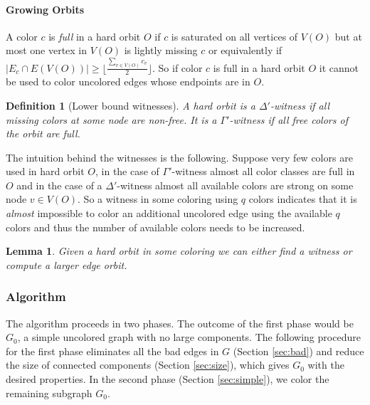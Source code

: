 \documentclass[titlepage, 11pt]{article}
\newtheorem{definition}{Definition}
\newtheorem{lemma}[theorem]{Lemma}
\begin{document}
\paragraph{Growing Orbits}
A color $c$ is \emph{full} in a hard orbit $O$ if $c$ is saturated on all vertices of $V(O)$ but at most one vertex in $V(O)$ is lightly missing $c$ or equivalently if $|E_c \cap E(V(O))| \geq  {\lfloor \frac{\sum_{v \in V(O)} c_v}{2} \rfloor}. $
So if color $c$ is full in a hard orbit $O$ it cannot be used to color uncolored edges whose endpoints are in $O$.
\begin{definition}[Lower bound witnesses]
A hard orbit is a $\Delta'$-witness if all missing colors at some node are non-free. It is a $\Gamma'$-witness if all free colors of the orbit are full.
\end{definition}
The intuition behind the witnesses is the following. Suppose very few colors are used in hard orbit $O$, in the case of $\Gamma'$-witness almost all color classes are full in $O$ and in the case of a $\Delta'$-witness almost all available colors are strong on some node $v \in V(O)$. So a witness in some coloring using $q$ colors indicates that it is \textit{almost} impossible to color an additional uncolored edge using the available $q$ colors and thus the number of available colors needs to be increased.  
\begin{lemma}\label{lemma:groworbit}
\cite{sanders05} Given a hard orbit in some coloring we can either find a witness or compute a larger edge orbit.
\end{lemma} 

\subsubsection{Algorithm}\label{sec:alg}
The algorithm proceeds in two phases. The outcome of the first phase would be $G_0$, a simple uncolored graph with no large components. 
The following procedure for the first phase 
eliminates all the bad edges in $G$ (Section \ref{sec:bad}) and reduce the size of connected components 
(Section \ref{sec:size}), which gives $G_0$ with the desired properties.
In the second phase (Section \ref{sec:simple}), we color the remaining subgraph $G_0$.
\end{document}
